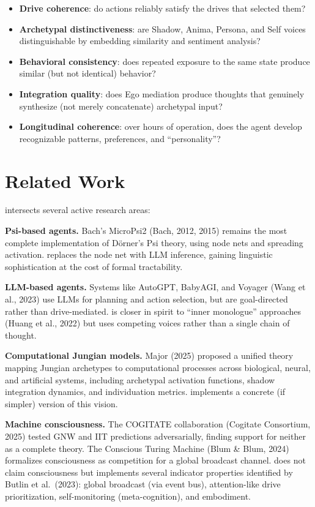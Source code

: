 \documentclass[11pt,oneside]{article}
\begin{document}
\begin{itemize}
  \item \textbf{Drive coherence}: do actions reliably satisfy the drives that selected them?
  \item \textbf{Archetypal distinctiveness}: are Shadow, Anima, Persona, and Self voices distinguishable by embedding similarity and sentiment analysis?
  \item \textbf{Behavioral consistency}: does repeated exposure to the same state produce similar (but not identical) behavior?
  \item \textbf{Integration quality}: does Ego mediation produce thoughts that genuinely synthesize (not merely concatenate) archetypal input?
  \item \textbf{Longitudinal coherence}: over hours of operation, does the agent develop recognizable patterns, preferences, and ``personality''?
\end{itemize}


\section{Related Work}
\label{sec:related}

\jungagent{} intersects several active research areas:

\textbf{Psi-based agents.}
Bach's MicroPsi2 (Bach, 2012, 2015) remains the most complete implementation of D\"orner's Psi theory, using node nets and spreading activation.
\jungagent{} replaces the node net with LLM inference, gaining linguistic sophistication at the cost of formal tractability.

\textbf{LLM-based agents.}
Systems like AutoGPT, BabyAGI, and Voyager (Wang et al., 2023) use LLMs for planning and action selection, but are goal-directed rather than drive-mediated.
\jungagent{} is closer in spirit to ``inner monologue'' approaches (Huang et al., 2022) but uses competing voices rather than a single chain of thought.

\textbf{Computational Jungian models.}
Major (2025) proposed a unified theory mapping Jungian archetypes to computational processes across biological, neural, and artificial systems, including archetypal activation functions, shadow integration dynamics, and individuation metrics.
\jungagent{} implements a concrete (if simpler) version of this vision.

\textbf{Machine consciousness.}
The COGITATE collaboration (Cogitate Consortium, 2025) tested GNW and IIT predictions adversarially, finding support for neither as a complete theory.
The Conscious Turing Machine (Blum \& Blum, 2024) formalizes consciousness as competition for a global broadcast channel.
\jungagent{} does not claim consciousness but implements several indicator properties identified by Butlin et al.\ (2023): global broadcast (via event bus), attention-like drive prioritization, self-monitoring (meta-cognition), and embodiment.
\end{document}

